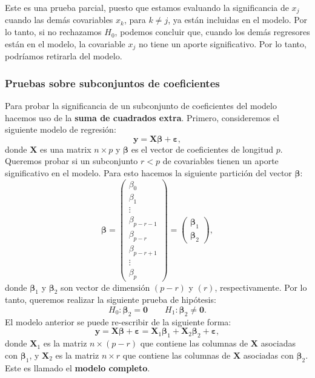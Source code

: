 \documentclass[
]{article}
\begin{document}
Este es una prueba parcial, puesto que estamos evaluando la significancia de \(x_{j}\) cuando las demás covariables \(x_{k}\), para \(k\neq j\), ya están incluidas en el modelo. Por lo tanto, si no rechazamos \(H_{0}\), podemos concluir que, cuando los demás regresores están en el modelo, la covariable \(x_{j}\) no tiene un aporte significativo. Por lo tanto, podríamos retirarla del modelo.

\hypertarget{pruebas-sobre-subconjuntos-de-coeficientes}{%
\subsubsection{Pruebas sobre subconjuntos de coeficientes}\label{pruebas-sobre-subconjuntos-de-coeficientes}}

Para probar la significancia de un subconjunto de coeficientes del modelo hacemos uso de la \textbf{suma de cuadrados extra}. Primero, consideremos el siguiente modelo de regresión:
\[
\boldsymbol y= \boldsymbol X\boldsymbol \beta+ \boldsymbol \varepsilon,
\]
donde \(\boldsymbol X\) es una matrix \(n \times p\) y \(\boldsymbol \beta\) es el vector de coeficientes de longitud \(p\). Queremos probar si un subconjunto \(r < p\) de covariables tienen un aporte significativo en el modelo. Para esto hacemos la siguiente partición del vector \(\boldsymbol \beta\):
\[
\boldsymbol \beta= \begin{pmatrix} \beta_{0} \\ \beta_{1} \\ \vdots \\ \beta_{p-r-1} \\ \hline \beta_{p-r} \\ \beta_{p-r+1} \\ \vdots \\  \beta_{p} \end{pmatrix} =  \begin{pmatrix} \boldsymbol \beta_{1} \\ \hline \boldsymbol \beta_{2}\end{pmatrix},
\]
donde \(\boldsymbol \beta_{1}\) y \(\boldsymbol \beta_{2}\) son vector de dimensión \((p-r)\) y \((r)\), respectivamente. Por lo tanto, queremos realizar la siguiente prueba de hipótesis:
\begin{equation}
H_{0}:  \boldsymbol \beta_{2} = \boldsymbol 0\qquad H_{1}:  \boldsymbol \beta_{2} \neq \boldsymbol 0.
\label{eq:Hsubset}
\end{equation}
El modelo anterior se puede re-escribir de la siguiente forma:
\[
\boldsymbol y= \boldsymbol X\boldsymbol \beta+ \boldsymbol \varepsilon= \boldsymbol X_{1}\boldsymbol \beta_{1}+ \boldsymbol X_{2}\boldsymbol \beta_{2} + \boldsymbol \varepsilon,
\]
donde \(\boldsymbol X_{1}\) es la matriz \(n\times (p-r)\) que contiene las columnas de \(\boldsymbol X\) asociadas con \(\boldsymbol \beta_{1}\), y \(\boldsymbol X_{2}\) es la matriz \(n\times r\) que contiene las columnas de \(\boldsymbol X\) asociadas con \(\boldsymbol \beta_{2}\). Este es llamado el \textbf{modelo completo}.
\end{document}
